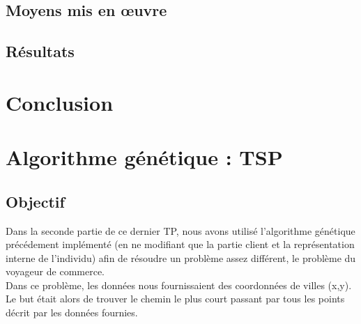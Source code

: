 \documentclass{article}
\begin{document}
\subsection{Moyens mis en \oe uvre}

\subsection{Résultats}

\section{Conclusion}

\section{Algorithme génétique : TSP}
\subsection{Objectif}
Dans la seconde partie de ce dernier TP, nous avons utilisé l'algorithme génétique précédement implémenté (en ne modifiant que la partie client et la représentation interne de l'individu) afin de résoudre un problème assez différent, le problème du voyageur de commerce.\\
Dans ce problème, les données nous fournissaient des coordonnées de villes (x,y). Le but était alors de trouver le chemin le plus court passant par tous les points décrit par les données fournies.
\end{document}
